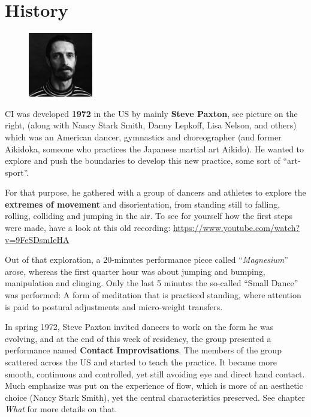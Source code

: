 \section{History}\label{sec:history}

\begin{figure}
\centering
\includegraphics[width=0.25\textwidth]{images/history}
\end{figure}

CI was developed \textbf{1972} in the US by mainly \textbf{Steve Paxton}, see picture on the right, (along with Nancy Stark Smith, Danny Lepkoff, Lisa Nelson, and others) which was an American dancer, gymnastics and choreographer (and former Aikidoka, someone who practices the Japanese martial art Aikido).
He wanted to explore and push the boundaries to develop this new practice, some sort of ``art-sport''.

For that purpose, he gathered with a group of dancers and athletes to explore the \textbf{extremes of movement} and disorientation, from standing still to falling, rolling, colliding and jumping in the air.
To see for yourself how the first steps were made, have a look at this old recording: \url{https://www.youtube.com/watch?v=9FeSDsmIeHA}

Out of that exploration, a 20-minutes performance piece called ``\textit{Magnesium}'' arose, whereas the first quarter hour was about jumping and bumping, manipulation and clinging.
Only the last 5 minutes the so-called ``Small Dance'' was performed: A form of meditation that is practiced standing, where attention is paid to postural adjustments and micro-weight transfers.

In spring 1972, Steve Paxton invited dancers to work on the form he was evolving, and at the end of this week of residency, the group presented a performance named \textbf{Contact Improvisations}.
The members of the group scattered across the US and started to teach the practice.
It became more smooth, continuous and controlled, yet still avoiding eye and direct hand contact.
Much emphasize was put on the experience of flow, which is more of an aesthetic choice (Nancy Stark Smith), yet the central characteristics preserved.
See chapter \textit{What} for more details on that.

